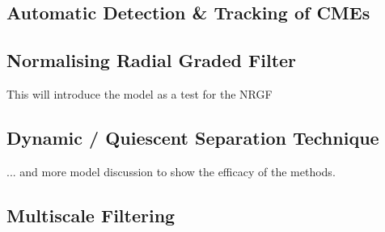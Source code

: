 \documentclass[namedreferences]{SolarPhysics}
\begin{document}
\begin{article}

%

\section{Automatic Detection \& Tracking of CMEs}

\subsection{Normalising Radial Graded Filter}
\label{sect_nrgf}

This will introduce the model as a test for the NRGF

\subsection{Dynamic / Quiescent Separation Technique}
\label{sect_separation}

... and more model discussion to show the efficacy of the methods.

\subsection{Multiscale Filtering}


\end{article}
\end{document}
